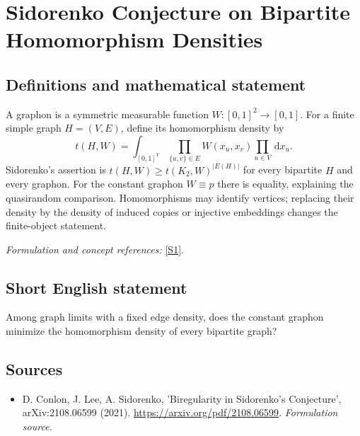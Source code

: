 \documentclass[11pt]{article}
\begin{document}
\section*{\texorpdfstring{Sidorenko Conjecture on Bipartite Homomorphism Densities}{Sidorenko Conjecture on Bipartite Homomorphism Densities}}\label{265}
\subsection{Definitions and mathematical statement}
A graphon is a symmetric measurable function $W:[0,1]^2\to[0,1]$. For a finite simple graph $H=(V,E)$, define its homomorphism density by
\[
 t(H,W)=\int_{[0,1]^{V}}\prod_{\{u,v\}\in E}W(x_u,x_v)\prod_{u\in V}{\,\mathrm{d}} x_u.
\]
Sidorenko's assertion is
$t(H,W)\ge t(K_2,W)^{|E(H)|}$ for every bipartite $H$ and every graphon. For the constant graphon $W\equiv p$ there is equality, explaining the quasirandom comparison. Homomorphisms may identify vertices; replacing their density by the density of induced copies or injective embeddings changes the finite-object statement.
\par\smallskip\textit{Formulation and concept references:} \href{https://arxiv.org/pdf/2108.06599}{[S1]}.

\subsection{Short English statement}
Among graph limits with a fixed edge density, does the constant graphon minimize the homomorphism density of every bipartite graph?
\subsection{Sources}
\begin{itemize}
\item[S1]D. Conlon, J. Lee, A. Sidorenko, 'Biregularity in Sidorenko's Conjecture', arXiv:2108.06599 (2021).
\url{https://arxiv.org/pdf/2108.06599}.
\textit{Formulation source.}
\end{itemize}
\end{document}
